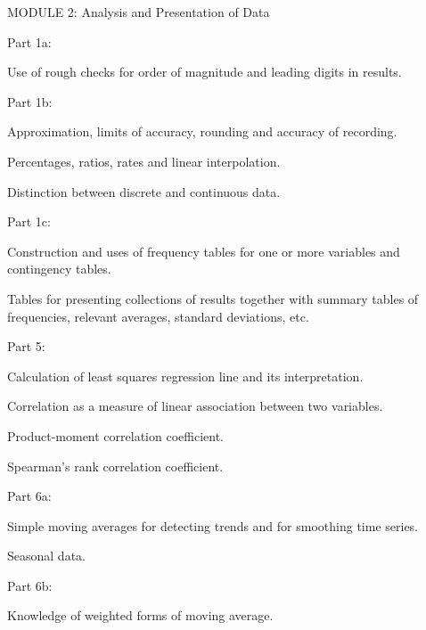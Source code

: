 




MODULE 2: Analysis and Presentation of Data








Part 1a:

Use of rough checks for order of magnitude and leading digits in results.


Part 1b:

Approximation, limits of accuracy, rounding and accuracy of recording. 

Percentages, ratios, rates and linear interpolation. 

Distinction between discrete and continuous data.


Part 1c:

Construction and uses of frequency tables for one or more variables and contingency tables. 

Tables for presenting collections of results together with summary tables of frequencies, relevant averages, standard deviations, etc.



 









Part 5:






Calculation of least squares regression line and its interpretation. 

Correlation as a measure of linear association between two variables. 

Product-moment correlation coefficient. 

Spearman's rank correlation coefficient.
 









Part 6a:

Simple moving averages for detecting trends and for smoothing time series. 

Seasonal data.


Part 6b:

Knowledge of weighted forms of moving average.



 


